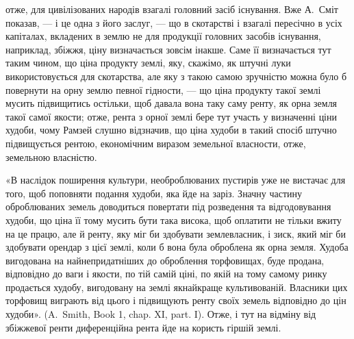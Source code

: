 \parcont{}  %
отже, для цивілізованих народів взагалі головний засіб існування. Вже А.~Сміт
показав, — і це одна з його заслуг, — що в скотарстві і взагалі пересічно в
усіх капіталах, вкладених в землю не для продукції головних засобів існування,
наприклад, збіжжя, ціну визначається зовсім інакше. Саме її визначається
тут таким чином, що ціна продукту землі, яку, скажімо, як штучні луки використовується
для скотарства, але яку з такою самою зручністю можна було б
повернути на орну землю певної гідности, — що ціна продукту такої землі мусить
підвищитись остільки, щоб давала вона таку саму ренту, як орна земля такої
самої якости; отже, рента з орної землі бере тут участь у визначенні ціни худоби,
чому Рамзей слушно відзначив, що ціна худоби в такий спосіб штучно
підвищується рентою, економічним виразом земельної власности, отже, земельною
власністю.

«В наслідок поширення культури, необроблюваних пустирів уже не вистачає
для того, щоб поповняти подання худоби, яка йде на заріз. Значну частину
оброблюваних земель доводиться повертати під розведення та відгодовування
худоби, що ціна її тому мусить бути така висока, щоб оплатити не
тільки вжиту на це працю, але й ренту, яку міг би здобувати землевласник,
і зиск, який міг би здобувати орендар з цієї землі, коли б вона була
оброблена як орна земля. Худоба вигодована на найнепридатніших до оброблення
торфовищах, буде продана, відповідно до ваги і якости, по тій самій ціні, по якій
на тому самому ринку продається худобу, вигодовану на землі якнайкраще
культивованій. Власники цих торфовищ виграють від цього і підвищують ренту
своїх земель відповідно до цін худоби». (A.~Smith, Book 1, chap. XI, part. I).
Отже, і тут на відміну від збіжжевої ренти диференційна рента йде на користь
гіршій землі.

